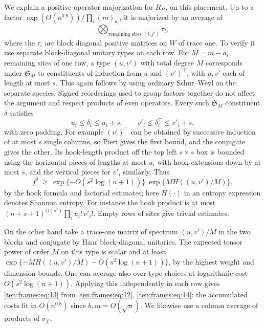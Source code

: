 We explain a positive-operator majorization for \(R_H\), on this placement. Up to a factor \(\exp(O(n^{0.8}))/\prod_i(m)_{a_i}\), it is majorized by an average of
\begin{equation}
 \bigotimes_{\text{remaining sites }(i,j')} \tau_i ,
 \label{ten:frames:eq:13}
\end{equation}
where the \(\tau_i\) are block diagonal positive matrices on \(W\) of trace one. To verify it use separate block-diagonal unitary types on each row. For \(M=m-a_i\) remaining sites of one row, a type \((u,v')\) with total degree \(M\) corresponds under \(\mathfrak S_M\) to constituents of induction from \(u\) and \((v')^\intercal\), with \(u,v'\) each of length at most \(s\). This again follows by using ordinary Schur--Weyl on the separate species. Signed reorderings used to group factors together do not affect the argument and respect products of even operators. Every such \(\mathfrak S_M\) constituent \(\delta\) satisfies
\[
 u_i\le\delta_i\le u_i+s,\qquad v'_i\le\delta^\intercal_i\le v'_i+s,
\]
with zero padding. For example \((v')^\intercal\) can be obtained by successive induction of at most \(s\) single columns, so Pieri gives the first bound, and the conjugate gives the other. Its hook-length product off the top left \(s\times s\) box is bounded using the horizontal pieces of lengths at most \(u_i\) with hook extensions down by at most \(s\), and the vertical pieces for \(v'_i\) similarly. Thus
\begin{equation}
 f^\delta\ \ge\ \exp\{-O(s^2\log(n+1))\}\ \exp\{M H((u,v')/M)\},
 \label{ten:frames:eq:14}
\end{equation}
by the hook formula and factorial estimates; here \(H(\cdot)\) in an entropy expression denotes Shannon entropy. For instance the hook product is at most \((n+s+1)^{O(s^2)}\prod_i u_i!\,v'_i!\). Empty rows of sites give trivial estimates.

On the other hand take a trace-one matrix of spectrum \((u,v')/M\) in the two blocks and conjugate by Haar block-diagonal unitaries. The expected tensor power of order \(M\) on this type is scalar and at least
\(\exp\{-M H((u,v')/M)-O(s^2\log(n+1))\}\), by the highest weight and dimension bounds. One can average also over type choices at logarithmic cost \(O(s^2\log(n+1))\). Applying this independently in each row gives \eqref{ten:frames:eq:13} from \eqref{ten:frames:eq:12}, \eqref{ten:frames:eq:14}: the accumulated costs fit in \(O(n^{0.8})\) since \(b,m=O(\sqrt n)\). We likewise use a column average of products of \(\sigma_{j'}\).

